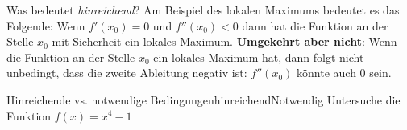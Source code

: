 \clearpage
Was bedeutet \emph{hinreichend}? Am Beispiel des lokalen Maximums bedeutet es das Folgende: Wenn $f'(x_0)=0$ und $f'' (x_0 )<0$ dann hat die Funktion an der Stelle $x_0$ mit Sicherheit ein lokales Maximum. \textbf{Umgekehrt aber nicht}: Wenn die Funktion an der Stelle $x_0$ ein lokales Maximum hat, dann folgt nicht unbedingt, dass die zweite Ableitung negativ ist: $f''(x_0)$ könnte auch $0$ sein.

\begin{bsp}
    {Hinreichende vs. notwendige Bedingungen}{hinreichendNotwendig}
    Untersuche die Funktion $f(x) = x^4-1$

    \vspace*{18cm}

\end{bsp} 

\clearpage

